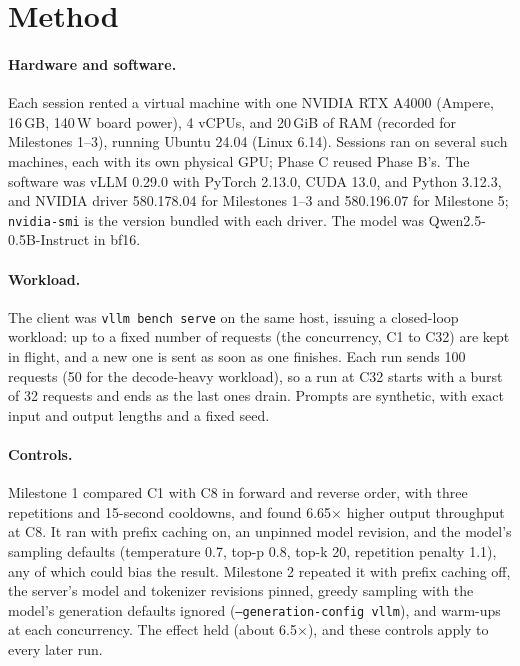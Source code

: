 \section{Method}
\label{sec:method}

\paragraph{Hardware and software.}
Each session rented a virtual machine with one NVIDIA RTX A4000 (Ampere, 16\,GB,
140\,W board power), 4 vCPUs, and 20\,GiB of RAM (recorded for Milestones 1--3),
running Ubuntu 24.04 (Linux 6.14). Sessions ran on several such machines, each with
its own physical GPU; Phase C reused Phase B's. The software was vLLM 0.29.0 with PyTorch 2.13.0, CUDA 13.0, and Python
3.12.3, and NVIDIA driver 580.178.04 for Milestones 1--3 and 580.196.07 for Milestone
5; \texttt{nvidia-smi} is the version bundled with each driver. The model was
Qwen2.5-0.5B-Instruct in bf16.

\paragraph{Workload.}
The client was \texttt{vllm bench serve} on the same host, issuing a closed-loop
workload: up to a fixed number of requests (the concurrency, C1 to C32) are kept in flight, and a
new one is sent as soon as one finishes. Each run sends 100 requests (50 for the
decode-heavy workload), so a run at C32 starts with a burst of 32 requests and ends as
the last ones drain. Prompts are synthetic, with exact input and output lengths and a
fixed seed.

\paragraph{Controls.}
Milestone 1 compared C1 with C8 in forward and reverse order, with three repetitions
and 15-second cooldowns, and found 6.65$\times$ higher output throughput at C8. It ran
with prefix caching on, an unpinned model revision, and the model's sampling defaults
(temperature 0.7, top-p 0.8, top-k 20, repetition penalty 1.1), any of which could
bias the result. Milestone 2 repeated it with prefix caching off, the server's model
and tokenizer revisions pinned, greedy sampling with the model's generation defaults
ignored (\texttt{--generation-config vllm}), and warm-ups at each concurrency. The
effect held (about 6.5$\times$), and these controls apply to every later run.

